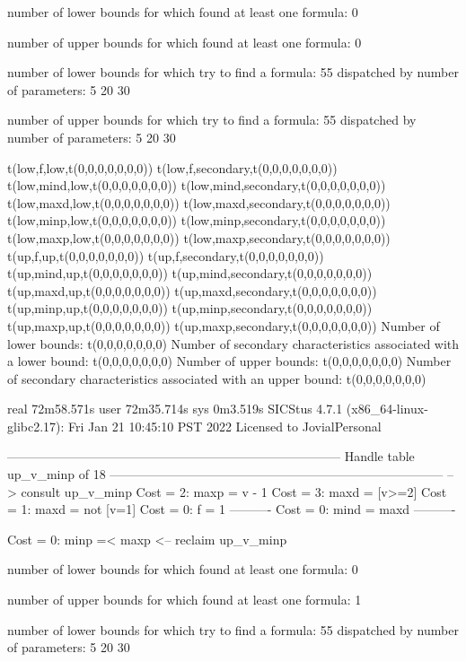 number of lower bounds for which found at least one formula: 0

number of upper bounds for which found at least one formula: 0

number of lower bounds for which try to find a formula: 55
dispatched by number of parameters: 5  20  30

number of upper bounds for which try to find a formula: 55
dispatched by number of parameters: 5  20  30

t(low,f,low,t(0,0,0,0,0,0,0))
t(low,f,secondary,t(0,0,0,0,0,0,0))
t(low,mind,low,t(0,0,0,0,0,0,0))
t(low,mind,secondary,t(0,0,0,0,0,0,0))
t(low,maxd,low,t(0,0,0,0,0,0,0))
t(low,maxd,secondary,t(0,0,0,0,0,0,0))
t(low,minp,low,t(0,0,0,0,0,0,0))
t(low,minp,secondary,t(0,0,0,0,0,0,0))
t(low,maxp,low,t(0,0,0,0,0,0,0))
t(low,maxp,secondary,t(0,0,0,0,0,0,0))
t(up,f,up,t(0,0,0,0,0,0,0))
t(up,f,secondary,t(0,0,0,0,0,0,0))
t(up,mind,up,t(0,0,0,0,0,0,0))
t(up,mind,secondary,t(0,0,0,0,0,0,0))
t(up,maxd,up,t(0,0,0,0,0,0,0))
t(up,maxd,secondary,t(0,0,0,0,0,0,0))
t(up,minp,up,t(0,0,0,0,0,0,0))
t(up,minp,secondary,t(0,0,0,0,0,0,0))
t(up,maxp,up,t(0,0,0,0,0,0,0))
t(up,maxp,secondary,t(0,0,0,0,0,0,0))
Number of lower bounds:                                             t(0,0,0,0,0,0,0)
Number of secondary characteristics associated with a lower bound:  t(0,0,0,0,0,0,0)
Number of upper bounds:                                             t(0,0,0,0,0,0,0)
Number of secondary characteristics associated with an upper bound: t(0,0,0,0,0,0,0)

real	72m58.571s
user	72m35.714s
sys	0m3.519s
SICStus 4.7.1 (x86_64-linux-glibc2.17): Fri Jan 21 10:45:10 PST 2022
Licensed to JovialPersonal


--------------------------------------------------------------------------------
Handle table up_v_minp of 18
--------------------------------------------------------------------------------
--> consult up_v_minp
Cost =  2:  maxp = v - 1
Cost =  3:  maxd = [v>=2]
Cost =  1:  maxd = not [v=1]
Cost =  0:  f    = 1
----------
Cost =  0:  mind = maxd
----------

Cost =  0:  minp =< maxp
<-- reclaim up_v_minp

number of lower bounds for which found at least one formula: 0

number of upper bounds for which found at least one formula: 1

number of lower bounds for which try to find a formula: 55
dispatched by number of parameters: 5  20  30

